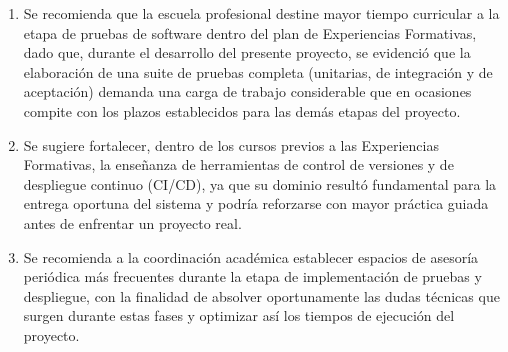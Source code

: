 \begin{enumerate}
    \item Se recomienda que la escuela profesional destine mayor tiempo curricular a la etapa de pruebas de software dentro del plan de Experiencias Formativas, dado que, durante el desarrollo del presente proyecto, se evidenció que la elaboración de una suite de pruebas completa (unitarias, de integración y de aceptación) demanda una carga de trabajo considerable que en ocasiones compite con los plazos establecidos para las demás etapas del proyecto.
    \item Se sugiere fortalecer, dentro de los cursos previos a las Experiencias Formativas, la enseñanza de herramientas de control de versiones y de despliegue continuo (CI/CD), ya que su dominio resultó fundamental para la entrega oportuna del sistema y podría reforzarse con mayor práctica guiada antes de enfrentar un proyecto real.
    \item Se recomienda a la coordinación académica establecer espacios de asesoría periódica más frecuentes durante la etapa de implementación de pruebas y despliegue, con la finalidad de absolver oportunamente las dudas técnicas que surgen durante estas fases y optimizar así los tiempos de ejecución del proyecto.
\end{enumerate}
